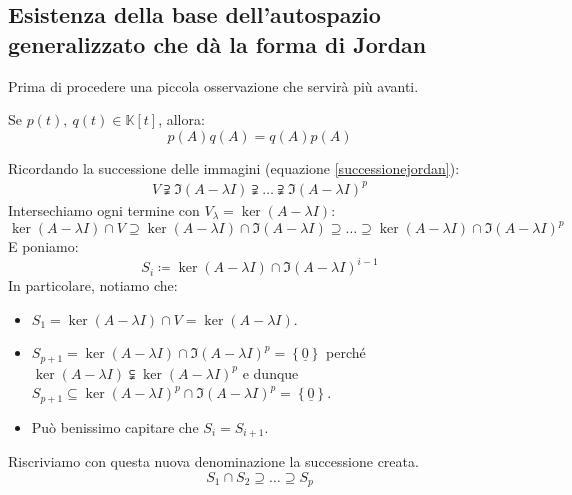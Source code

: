 \subsection{Esistenza della base dell'autospazio generalizzato che dà la forma di Jordan}
Prima di procedere una piccola osservazione che servirà più avanti.
\begin{observe}
Se $p\left(t\right),\ q\left(t\right)\in\mathbb{K}\left[t\right]$, allora:
\begin{equation}
p\left(A\right)q\left(A\right)=q\left(A\right)p\left(A\right)
\end{equation}
\vspace{-6mm}
\end{observe}
\begin{demonstration}
	Ricordando la successione delle immagini (equazione \ref{successionejordan}):
	\begin{gather*}
		V\supsetneqq \Im \left(A-\lambda I\right)\supsetneqq\ldots\supsetneqq\Im \left(A-\lambda I\right)^p
	\end{gather*}
	Intersechiamo ogni termine con $V_{\lambda}=\ker\left(A-\lambda I\right)$:
	\begin{equation*}
		\ker\left(A-\lambda I\right)\cap V\supseteq \ker\left(A-\lambda I\right)\cap\Im \left(A-\lambda I\right)\supseteq\ldots\supseteq\ker\left(A-\lambda I\right)\cap\Im \left(A-\lambda I\right)^p
	\end{equation*}
	E poniamo:
	\begin{equation}
		S_i\coloneqq \ker\left(A-\lambda I\right)\cap \Im\left(A-\lambda I\right)^{i-1}
	\end{equation}
	In particolare, notiamo che:
	\begin{itemize}
		\item $S_1=\ker\left(A-\lambda I\right)\cap V=\ker\left(A-\lambda I\right)$.
		\item $S_{p+1}=\ker\left(A-\lambda I\right)\cap \Im\left(A-\lambda I\right)^{p}=\left\{\underline{0}\right\}$ perché $\ker\left(A-\lambda I\right)\subsetneqq \ker\left(A-\lambda I\right)^p$ e dunque $S_{p+1}\subseteq \ker\left(A-\lambda I\right)^p\cap \Im\left(A-\lambda I\right)^{p}=\left\{\underline{0}\right\}$.
		\item Può benissimo capitare che $S_i=S_{i+1}$.
	\end{itemize}
Riscriviamo con questa nuova denominazione la successione creata.
	\begin{equation}
	S_1\cap S_2\supseteq\ldots\supseteq S_p
\end{equation}
\end{demonstration}